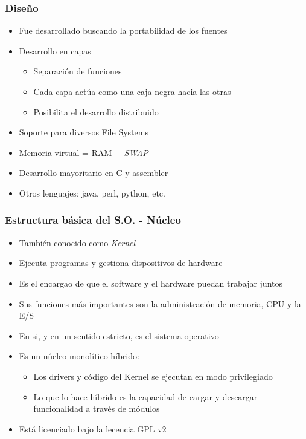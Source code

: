\begin{frame}
	\frametitle{Diseño}
	\begin{itemize}
		\item Fue desarrollado buscando la portabilidad de los fuentes
		\item Desarrollo en capas
		\begin{itemize}
			\item Separación de funciones
			\item Cada capa actúa como una caja negra hacia las otras
			\item Posibilita el desarrollo distribuido
		\end{itemize}
		\item Soporte para diversos File Systems
		\item Memoria virtual = RAM + \textit{SWAP}
		\item Desarrollo mayoritario en C y assembler
		\item Otros lenguajes: java, perl, python, etc.
	\end{itemize}
\end{frame}

\begin{frame}
	\frametitle{Estructura básica del S.O. - Núcleo}
	\begin{itemize}
		\item También conocido como \textit{Kernel}
		\item Ejecuta programas y gestiona dispositivos de hardware
		\item Es el encargao de que el software y el hardware puedan trabajar juntos
		\item Sus funciones más importantes son la administración de memoria, CPU y la E/S
		\item En si, y en un sentido estricto, es el sistema operativo
		\item Es un núcleo monolítico híbrido:
		\begin{itemize}
			\item Los drivers y código del Kernel se ejecutan en modo privilegiado
			\item Lo que lo hace híbrido es la capacidad de cargar y descargar funcionalidad a través de módulos
		\end{itemize}
		\item Está licenciado bajo la lecencia GPL v2
	\end{itemize}
\end{frame}

